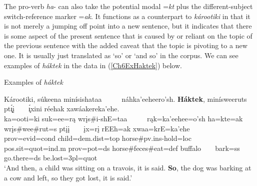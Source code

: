 The pro-verb \textit{ha}- can also take the potential modal =\textit{kt} plus the different-subject switch-reference marker =\textit{ak}. It functions as a counterpart to \textit{károotiki} in that it is not merely a jumping off point into a new sentence, but it indicates that there is some aspect of the present sentence that is caused by or reliant on the topic of the previous sentence with the added caveat that the topic is pivoting to a new one. It is usually just translated as `so' or `and so' in the corpus. We can see examples of \textit{háktek} in the data in (\ref{Ch6ExHaktek}) below.

\begin{exe}
    \item\label{Ch6ExHaktek} Examples of \textit{háktek}

    \begin{xlist}
        \item\label{Ch6ExHaktekA} \glll Károotiki, súkeena minísishataa ~ ~ ~ náhka'eeheero'sh. \textbf{Háktek}, minísweeruts pt\'{ı̨}į ~ ~ \'{ı̨}xini réehak xawáakereka'ehe.\\
        ka=ooti=ki suk=ee=rą wrįs\#i-shE=taa ~ ~ ~ rąk=ka'eehee=o'sh ha=kte=ak wrįs\#wee\#rut=s ptįį ~ ~ įx=rį rEEh=ak xwaa=krE=ka'ehe\\
        prov=evid=cond \textnormal{child}=dem.dist=top \textnormal{horse}\#pv.ins-\textnormal{hold}=loc ~ ~ ~ pos.sit=quot=ind.m prov=pot=ds \textnormal{horse}\#\textnormal{feces}\#\textnormal{eat}=def \textnormal{buffalo} ~ ~ \textnormal{bark}=ss \textnormal{go.there}=ds \textnormal{be.lost}=3pl=quot\\
        \glt `And then, a child was sitting on a travois, it is said. \textbf{So}, the dog was barking at a cow and left, so they got lost, it is said.' \citep[278]{hollow1973b}


\end{xlist}
\end{exe}
